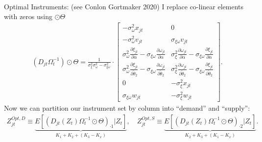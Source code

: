 \documentclass[xcolor=pdftex,dvipsnames,table,mathserif,aspectratio=169]{beamer}
\begin{document}
\begin{frame}{Optimal Instruments: (see Conlon Gortmaker 2020) }
\noindent I replace co-linear elements with zeros using $\odot \Theta$
\begin{align*}
    (D_{jt} \Omega_t^{-1} ) \odot \Theta =  \frac{1}{\sigma_\xi^2 \sigma_\omega^2 - \sigma_{\xi \omega}^2} \cdot 
    \begin{bmatrix}
        -\sigma_\omega^2 x_{jt} & 0  \\
        -\sigma_\omega^2 v_{jt} & \sigma_{\xi \omega} v_{jt} \\
        \sigma_\omega^2 \frac{\partial \xi_{jt}}{\partial \alpha} - 
        \sigma_{\xi\omega}\frac{\partial \omega_{jt}}{\partial \alpha} 
        & \sigma_{\xi}^2 \frac{\partial \omega_{jt}}{\partial \alpha}  - 
        \sigma_{\xi\omega}\frac{\partial \xi_{jt}}{\partial \alpha}  \\
        \sigma_\omega^2 \frac{\partial \xi_{jt}}{\partial \widetilde{\theta}_2}  -
        \sigma_{\xi\omega}\frac{\partial \omega_{jt}}{\partial \widetilde{\theta}_2} 
        & \sigma_{\xi}^2 \frac{\partial \omega_{jt}}{\partial \widetilde{\theta}_2} - 
        \sigma_{\xi\omega}\frac{\partial \xi_{jt}}{\partial \widetilde{\theta}_2}\\
        0 &  -\sigma_{\xi}^2 x_{jt} \\
        \sigma_{\xi\omega} w_{jt} & -\sigma_{\xi}^2 w_{jt}
    \end{bmatrix}
    .
\end{align*}
\noindent Now we can partition our instrument set by column into ``demand'' and ``supply'': 
\begin{align*}
    Z_{jt}^{\textit{Opt},D} \equiv \underbrace{E[(D_{jt}(Z_t) \Omega_t^{-1} \odot \Theta)_{\cdot 1} | Z_t]}_{K_1 + K_2 + (K_3 - K_x)}, \quad Z_{jt}^{\textit{Opt},S} \equiv \underbrace{E[(D_{jt}(Z_t)\Omega_t^{-1} \odot \Theta)_{\cdot 2} | Z_t]}_{K_2 + K_3+ (K_1 - K_x)}.
\end{align*}
\end{frame}
\end{document}
